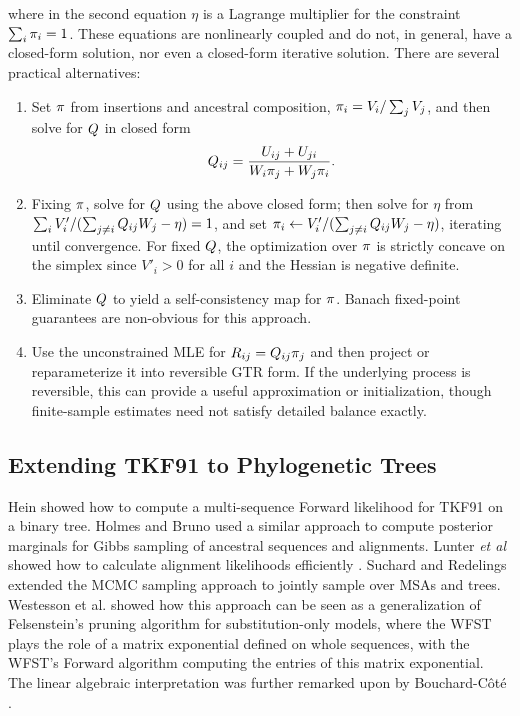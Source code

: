 where in the second equation $\eta$ is a Lagrange multiplier for the constraint $\sum_i \pi_i = 1$.
These equations are nonlinearly coupled and do not, in general, have a closed-form solution,
nor even a closed-form iterative solution.
There are several practical alternatives:
\begin{enumerate}
  \item Set $\pi$ from insertions and ancestral composition, $\pi_i = V_i / \sum_j V_j$, and then solve for $Q$ in closed form
  \[
Q_{ij} = \frac{U_{ij} + U_{ji}}{W_i \pi_j + W_j \pi_i}.
  \]
  \item Fixing $\pi$, solve for $Q$ using the above closed form; then solve for $\eta$ from $\sum_i V'_i / (\sum_{j \neq i} Q_{ij} W_j - \eta) = 1$, and set $\pi_i \leftarrow V'_i / (\sum_{j \neq i} Q_{ij} W_j - \eta)$, iterating until convergence.
  For fixed $Q$, the optimization over $\pi$ is strictly concave on the simplex since $V'_i > 0$ for all $i$ and the Hessian is negative definite.
  \item Eliminate $Q$ to yield a self-consistency map for $\pi$. Banach fixed-point guarantees are non-obvious for this approach.
  \item Use the unconstrained MLE for $R_{ij} = Q_{ij} \pi_j$ and then project or reparameterize it into reversible GTR form.
  If the underlying process is reversible, this can provide a useful approximation or initialization, though finite-sample estimates need not satisfy detailed balance exactly.
\end{enumerate}


\subsection{Extending TKF91 to Phylogenetic Trees}

Hein \cite{Hein2000} showed how to compute a multi-sequence Forward likelihood for TKF91 on a binary tree.
Holmes and Bruno \cite{HolmesBruno2001} used a similar approach to compute posterior marginals for Gibbs sampling of ancestral sequences and alignments.
Lunter {\em et al} showed how to calculate alignment likelihoods efficiently \cite{LunterSongMiklosHein2003}.
Suchard and Redelings \cite{RedelingsSuchard2005} extended the MCMC sampling approach to jointly sample over MSAs and trees.
Westesson et al. \cite{WestessonEtAl2012} showed how this approach can be seen as a generalization of Felsenstein's pruning algorithm for substitution-only models,
where the WFST plays the role of a matrix exponential defined on whole sequences, with the WFST's Forward algorithm computing the entries of this matrix exponential.
The linear algebraic interpretation was further remarked upon by Bouchard-C\^ot\'e \cite{bouchardcôté2013noteprobabilisticmodelsstrings}.

